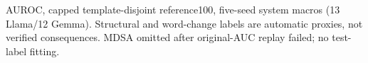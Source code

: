 AUROC, capped template-disjoint reference100, five-seed system macros (13 Llama/12 Gemma). Structural and word-change labels are automatic proxies, not verified consequences. MDSA omitted after original-AUC replay failed; no test-label fitting.
